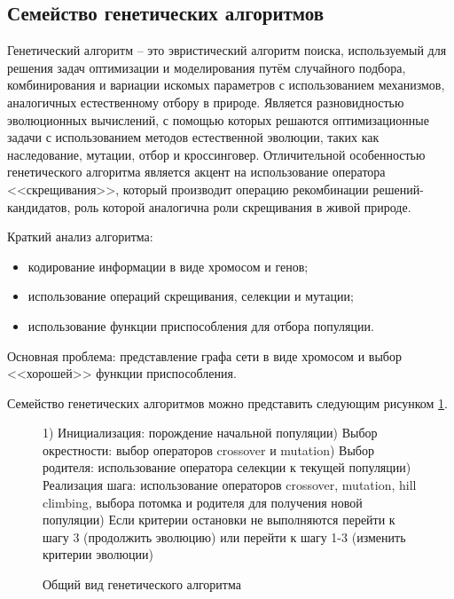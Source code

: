 \clearpage

\subsection{Семейство генетических алгоритмов}\label{sec:genetic}
Генетический алгоритм -- это эвристический алгоритм поиска, используемый для решения задач оптимизации 
и моделирования путём случайного подбора, комбинирования и вариации искомых параметров с использованием 
механизмов, аналогичных естественному отбору в природе. Является разновидностью эволюционных вычислений, 
с помощью которых решаются оптимизационные задачи с использованием методов естественной эволюции, таких 
как наследование, мутации, отбор и кроссинговер. Отличительной особенностью генетического алгоритма является 
акцент на использование оператора <<скрещивания>>, который производит операцию рекомбинации 
решений-кандидатов, роль которой аналогична роли скрещивания в живой природе.

Краткий анализ алгоритма:
\begin{itemize}
    \item кодирование информации в виде хромосом и генов;
    \item использование операций скрещивания, селекции и мутации;
    \item использование функции приспособления для отбора популяции.
\end{itemize}

Основная проблема: представление графа сети в виде хромосом и выбор <<хорошей>> функции приспособления.

Семейство генетических алгоритмов можно представить следующим рисунком \ref{alg:genetic}.

\begin{figure}[ht!]
    \begin{algorithm}[H]
        1) Инициализация: порождение начальной популяции) Выбор окрестности: выбор операторов crossover и mutation) Выбор родителя: использование оператора селекции к текущей популяции) Реализация шага: использование операторов crossover, 
            mutation, hill climbing, выбора потомка и родителя для получения 
            новой популяции) Если критерии остановки не выполняются перейти к шагу 3 (продолжить эволюцию) 
            или перейти к шагу 1-3 (изменить критерии эволюции)\;
    \end{algorithm}
    \vspace*{-1.5em}
    \caption{Общий вид генетического алгоритма}
    \label{alg:genetic}
\end{figure}

